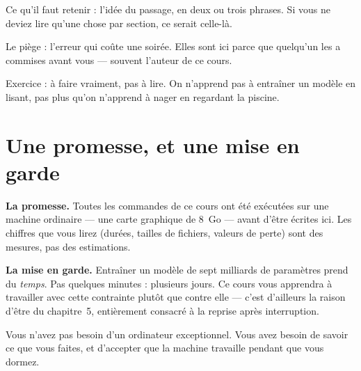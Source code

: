 \begin{nkretenir}
Ce qu'il faut retenir : l'idée du passage, en deux ou trois phrases. Si vous ne
deviez lire qu'une chose par section, ce serait celle-là.
\end{nkretenir}

\begin{nkpiege}
Le piège : l'erreur qui coûte une soirée. Elles sont ici parce que quelqu'un
les a commises avant vous — souvent l'auteur de ce cours.
\end{nkpiege}

\begin{nkexo}
Exercice : à faire vraiment, pas à lire. On n'apprend pas à entraîner un modèle
en lisant, pas plus qu'on n'apprend à nager en regardant la piscine.
\end{nkexo}

\section{Une promesse, et une mise en garde}

\textbf{La promesse.} Toutes les commandes de ce cours ont été exécutées sur une
machine ordinaire — une carte graphique de 8~Go — avant d'être écrites ici. Les
chiffres que vous lirez (durées, tailles de fichiers, valeurs de perte) sont des
mesures, pas des estimations.

\textbf{La mise en garde.} Entraîner un modèle de sept milliards de paramètres
prend du \emph{temps}. Pas quelques minutes : plusieurs jours. Ce cours vous
apprendra à travailler avec cette contrainte plutôt que contre elle — c'est
d'ailleurs la raison d'être du chapitre~5, entièrement consacré à la reprise
après interruption.

\begin{nkretenir}
Vous n'avez pas besoin d'un ordinateur exceptionnel. Vous avez besoin de savoir
ce que vous faites, et d'accepter que la machine travaille pendant que vous
dormez.
\end{nkretenir}
